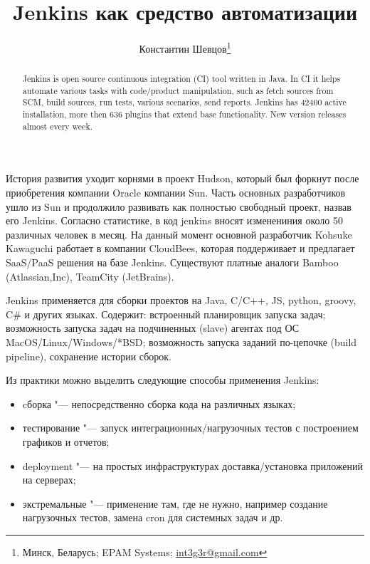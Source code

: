 \documentclass[10pt, a5paper]{article}
\begin{document}
\title{Jenkins как средство автоматизации}%

\author{Константин Шевцов\footnote{Минск, Беларусь; EPAM Systems; \url{int3g3r@gmail.com}}}
\maketitle

\begin{abstract}
Jenkins is open source continuous integration (CI) tool written in Java. In CI it helps automate various tasks with code/product manipulation, such as fetch sources from SCM, build sources, run tests, various scenarios, send reports. Jenkins has 42400 active installation, more then 636 plugins that extend base functionality. New version releases almost every week.
\end{abstract}

История развития уходит корнями в проект Hudson, который был форкнут после приобретения компании Oracle компании Sun. Часть основных разработчиков ушло из Sun и продолжило развивать как полностью свободный проект, назвав его Jenkins. Согласно статистике, в код jenkins вносят изменениния около 50 различных человек в месяц. На данный момент основной разработчик Kohsuke Kawaguchi работает в компании CloudBees, которая поддерживает и предлагает SaaS/PaaS решения на базе Jenkins. Существуют платные аналоги Bamboo (Atlassian,Inc), TeamCity (JetBrains).



Jenkins применяется для сборки проектов на Java, C/C++, JS, python, groovy, C\# и других языках. Содержит: встроенный планировщик запуска задач; возможность запуска задач на подчиненных (slave) агентах под ОС MacOS/Linux/Windows/*BSD; возможность запуска заданий по-цепочке (build pipeline), сохранение истории сборок.

Из практики можно выделить следующие способы применения Jenkins:

\begin{itemize}
  \item cборка "--- непосредственно сборка кода на различных языках;
  \item тестирование "--- запуск интеграционных/нагрузочных тестов с построением графиков и отчетов;
  \item deployment "--- на простых инфраструктурах доставка/установка приложений на серверах;
  \item экстремальные "--- применение там, где не нужно, например создание нагрузочных тестов, замена cron для системных задач и др.
\end{itemize}
\end{document}
